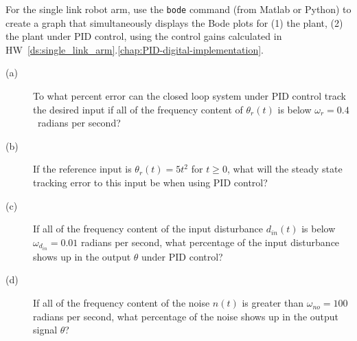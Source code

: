 For the single link robot arm, use the \texttt{bode} command (from Matlab or Python) to create a graph that simultaneously displays the Bode plots for (1) the plant, (2) the plant under PID control, using the control gains calculated in HW~\ref{ds:single_link_arm}.\ref{chap:PID-digital-implementation}.  
\begin{description}
\item[(a)]  To what percent error can the closed loop system under PID control track the desired input if all of the frequency content of $\theta_r(t)$ is below
$\omega_r = 0.4$~radians per second?
\item[(b)] If the reference input is $\theta_r(t) = 5t^2$ for $t\geq 0$, what will the steady state tracking error to this input be when using PID control?
\item[(c)] If all of the frequency content of the input disturbance $d_{in}(t)$ is below $\omega_{d_{in}} = 0.01$ radians per second, what percentage of the input disturbance shows up in the output $\theta$ under PID control?
\item[(d)] If all of the frequency content of the noise $n(t)$ is greater than $\omega_{no} = 100$ radians per second, what percentage of the noise shows up in the output signal $\theta$?
\end{description}
